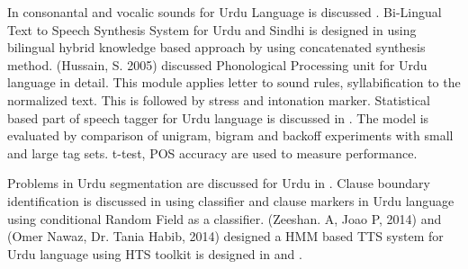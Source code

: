 In \cite{saleem2002urdu} consonantal and vocalic sounds for Urdu Language is discussed . Bi-Lingual Text to Speech Synthesis 
System for Urdu and Sindhi is designed in \cite{shah2004bi} using
bilingual hybrid knowledge based approach by using concatenated synthesis method. (Hussain, S.
2005) discussed Phonological Processing unit for Urdu language in detail. This module applies
letter to sound rules, syllabification to the normalized text. This is followed by stress and intonation
marker. Statistical based part of speech tagger for
Urdu language is discussed in \cite{anwar2007statistical}. The model is evaluated by comparison of unigram, bigram and backoff
experiments with small and large tag sets. t-test, POS accuracy are used to measure performance.


Problems in Urdu segmentation are discussed for Urdu in \cite{durrani2010urdu}. Clause boundary identification is discussed in 
\cite{parveen2011clause} using classifier
and clause markers in Urdu language using conditional Random Field as a classifier. (Zeeshan. A,
Joao P, 2014) and (Omer Nawaz, Dr. Tania Habib, 2014) designed a HMM based TTS system for
Urdu language using HTS toolkit is designed in \cite{ahmed2014hmm} and \cite{nawaz2014hidden}.




